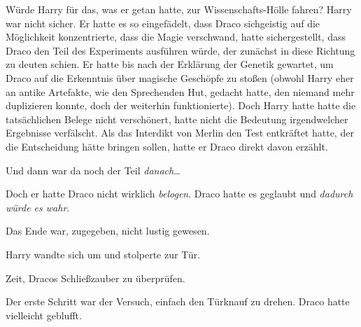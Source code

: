 Würde Harry für das, was er getan hatte, zur Wissenschafts-Hölle fahren? Harry war nicht sicher. Er hatte es so eingefädelt, dass Draco sichgeistig auf die Möglichkeit konzentrierte, dass die Magie verschwand, hatte sichergestellt, dass Draco den Teil des Experiments ausführen würde, der zunächst in diese Richtung zu deuten schien. Er hatte bis nach der Erklärung der Genetik gewartet, um Draco auf die Erkenntnis über magische Geschöpfe zu stoßen (obwohl Harry eher an antike Artefakte, wie den Sprechenden Hut, gedacht hatte, den niemand mehr duplizieren konnte, doch der weiterhin funktionierte). Doch Harry hatte hatte die tatsächlichen Belege nicht verschönert, hatte nicht die Bedeutung irgendwelcher Ergebnisse verfälscht. Als das Interdikt von Merlin den Test entkräftet hatte, der die Entscheidung hätte bringen sollen, hatte er Draco direkt davon erzählt.

Und dann war da noch der Teil \emph{danach}…

Doch er hatte Draco nicht wirklich \emph{belogen}. Draco hatte es geglaubt und \emph{dadurch würde es wahr}.

Das Ende war, zugegeben, nicht lustig gewesen.

Harry wandte sich um und stolperte zur Tür.

Zeit, Dracos Schließzauber zu überprüfen.

Der erste Schritt war der Versuch, einfach den Türknauf zu drehen. Draco hatte vielleicht geblufft.

